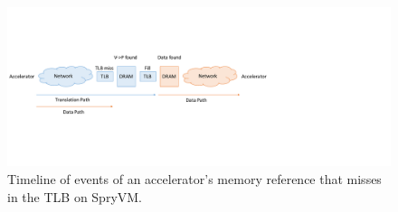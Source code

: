 \begin{figure}
	\includegraphics[width=\textwidth]{figures/time_event_partition_miss.pdf}
	\caption{Timeline of events of an accelerator's memory reference that misses in the TLB on SpryVM.}
	\label{fig:pagewalk_partition_miss}
\end{figure}


 





